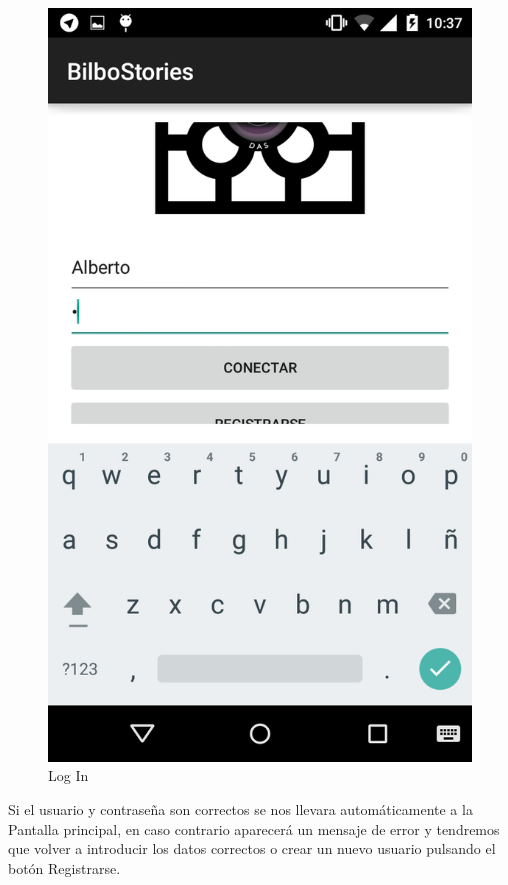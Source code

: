 \documentclass[11pt,a4paper, titlepage]{article}
\begin{document}
	\begin{figure}[hbtp]
		\centering
		\includegraphics[scale = 0.25 ]{img/1}
		\caption{Log In}
		\label{login2}
	\end{figure}
	
	Si el usuario y contraseña son correctos se nos llevara automáticamente a la Pantalla principal, en caso contrario aparecerá un mensaje de error y tendremos que volver a introducir los datos correctos o crear un nuevo usuario pulsando el botón Registrarse.
	
\end{document}
